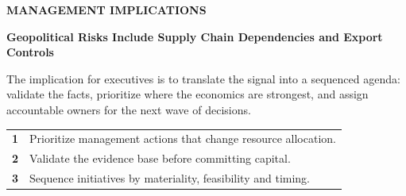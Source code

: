 \documentclass[10pt,a4paper]{article}
\begin{document}
\clearpage
{\textcolor{BOBlue}{\scriptsize\bfseries MANAGEMENT IMPLICATIONS}}\par\vspace{-1pt}
{\Large\sffamily\bfseries\color{BONavy} Geopolitical Risks Include Supply Chain Dependencies and Export Controls}\par\vspace{4pt}
{\small The implication for executives is to translate the signal into a sequenced agenda: validate the facts, prioritize where the economics are strongest, and assign accountable owners for the next wave of decisions.}\par
\begin{tabularx}{\linewidth}{p{10mm}Y}
\textcolor{BOBlue}{\bfseries 1} & Prioritize management actions that change resource allocation. \\[5pt]
\textcolor{BOBlue}{\bfseries 2} & Validate the evidence base before committing capital. \\[5pt]
\textcolor{BOBlue}{\bfseries 3} & Sequence initiatives by materiality, feasibility and timing. \\[5pt]
\end{tabularx}
\vspace{6pt}

\vspace{6pt}{\textcolor{BOBlue}{\scriptsize\bfseries EXECUTION ROADMAP}}\par
\begin{center}
\end{center}
\end{document}
